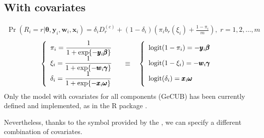 \documentclass[letterpaper,10pt,english]{sphinxmanual}
\begin{document}
\subsection{With covariates}
\label{\detokenize{manual:cubsh-with-covariates}}\label{\detokenize{manual:id19}}
\sphinxAtStartPar
{}
\begin{equation*}
\begin{split}\Pr(R_i=r|\pmb\theta, \pmb y_i, \pmb w_i, \pmb x_i) = \delta_i D_r^{(c)} + (1-\delta_i)\left(\pi_i b_r(\xi_i) + \frac{1-\pi_i}{m} \right)
,\; r=1,2,\ldots,m\end{split}
\end{equation*}\begin{equation*}
\begin{split}\left\{
\begin{array}{l}
    \pi_i = \dfrac{1}{1+\exp\{-\pmb y_i \pmb \beta\}}
    \\
    \xi_i = \dfrac{1}{1+\exp\{-\pmb w_i \pmb \gamma\}}
    \\
    \delta_i = \dfrac{1}{1+\exp\{-\pmb x_i \pmb \omega\}}
\end{array}
\right.
\quad \equiv \quad
\left\{
\begin{array}{l}
    \mathrm{logit}(1-\pi_i) = -\pmb y_i \pmb \beta
    \vphantom{\dfrac{1}{1+\exp\{-\pmb y_i \pmb \beta\}}}
    \\
    \mathrm{logit}(1-\xi_i) = -\pmb w_i \pmb \gamma
    \vphantom{\dfrac{1}{1+\exp\{-\pmb w_i \pmb \gamma\}}}
    \\
    \mathrm{logit}(\delta_i) = \pmb x_i \pmb \omega
    \vphantom{\dfrac{1}{1+\exp\{-\pmb x_i \pmb \omega\}}}
\end{array}
\right.\end{split}
\end{equation*}
\sphinxAtStartPar
Only the model with covariates for all components (GeCUB) has been
currently defined and implemented, as in the R package .

\sphinxAtStartPar
Nevertheless, thanks to the symbol  provided by the
, we can specify a different combination
of covariates.
\end{document}

